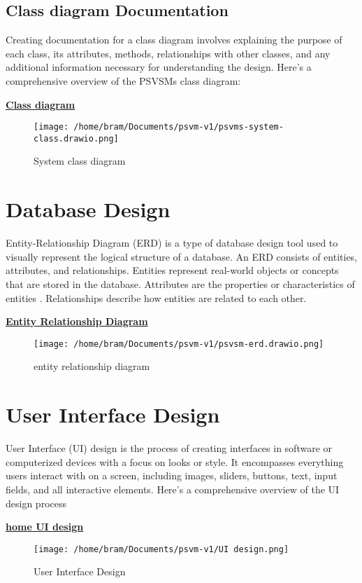 \documentclass[a4paper, 12pt]{report}
\begin{document}
\subsection{Class diagram Documentation}
\noindent Creating documentation for a class diagram involves explaining the purpose of each class, its attributes, methods, relationships with other classes, and any additional information necessary for understanding the design. Here's a comprehensive overview of the PSVSMs  class diagram:
\par
\textbf{\underline{Class diagram}}
\begin{figure}[h] %
  \centering
  \texttt{[image: /home/bram/Documents/psvm-v1/psvms-system-class.drawio.png]} %
  \caption{System class diagram} %
  \label{fig:Class diagram} %
\end{figure}
\clearpage
\section{Database Design}
\noindent Entity-Relationship Diagram (ERD) is a type of database design tool used to visually represent the logical structure of a database.
An ERD consists of entities, attributes, and relationships. Entities represent real-world objects or concepts  that are stored in the database. Attributes are the properties or characteristics of entities . Relationships describe how entities are related to each other.\par
\textbf{\underline{Entity Relationship Diagram}}
\par
\begin{figure}[h] %
  \centering
  \texttt{[image: /home/bram/Documents/psvm-v1/psvsm-erd.drawio.png]} %
  \caption{entity relationship diagram} %
  \label{fig:ERD} %
\end{figure}
\clearpage
\section{User Interface Design}
\noindent User Interface (UI) design is the process of creating interfaces in software or computerized devices with a focus on looks or style. It encompasses everything users interact with on a screen, including images, sliders, buttons, text, input fields, and all interactive elements. Here's a comprehensive overview of the UI design process\par
\textbf{\underline{home UI design}}\par 
\par
\begin{figure}[h] %
  \centering
  \texttt{[image: /home/bram/Documents/psvm-v1/UI design.png]} %
  \caption{User Interface Design} %
  \label{fig:UI design} %
\end{figure}
\end{document}
